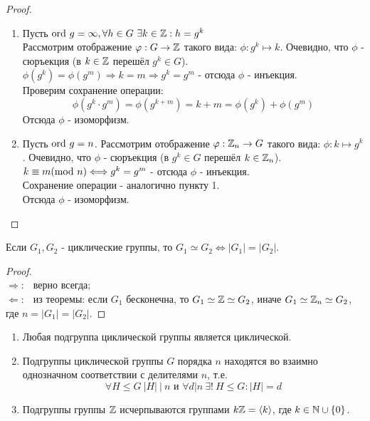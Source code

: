 \begin{proof}\tab
    \begin{enumerate}
        \item Пусть $\textup{ord } g = \infty, \forall h \in G \ \exists k \in \mathbb{Z}: h = g^k$\\
        Рассмотрим отображение $\varphi: G \rightarrow \mathbb{Z}$ такого вида: $\phi: g^k \mapsto k$. Очевидно, что $\phi$ - сюръекция (в $k\in \mathbb{Z}$ перешёл $g^k \in G$).\\
        $\phi(g^k) = \phi(g^m) \Longrightarrow k = m \Longrightarrow g^k = g^m$ - отсюда $\phi$ - инъекция.\\
        Проверим сохранение операции:
        \[\phi(g^k \cdot g^m) = \phi(g^{k+m}) = k+m = \phi(g^k) + \phi(g^m)\]
        Отсюда $\phi$ - изоморфизм.
        \item Пусть $\textup{ord } g = n$. Рассмотрим отображение $\varphi: \mathbb{Z}_n \rightarrow G$ такого вида: $\phi: k \mapsto g^k$. Очевидно, что $\phi$ - сюръекция (в $g^k\in G$ перешёл $k \in \mathbb{Z}_n$).\\
        $k \equiv m (\textup{mod } n) \Longleftrightarrow g^k = g^m$ - отсюда $\phi$ - инъекция.\\
        Сохранение операции - аналогично пункту 1.\\ 
        Отсюда $\phi$ - изоморфизм.
    \end{enumerate}
\end{proof}
\begin{consequense}
    Если $G_1, G_2$ - циклические группы, то $G_1 \simeq G_2 \Longleftrightarrow |G_1| = |G_2|$.
\end{consequense}
\begin{proof} \tab\\
    $\Longrightarrow : \ \ $ верно всегда;\\
    $\Longleftarrow : \ \ $ из теоремы: если $G_1$ бесконечна, то $G_1 \simeq \mathbb{Z} \simeq G_2$, иначе $G_1 \simeq \mathbb{Z}_n \simeq G_2$, где $n = |G_1| = |G_2|$.
\end{proof}
\begin{theoremnum} \tab
    \begin{enumerate}
        \item Любая подгруппа циклической группы является циклической.
        \item Подгруппы циклической группы $G$ порядка $n$ находятся во взаимно однозначном соответствии с делителями $n$, т.е.
        \[\forall H \leq G \ |H| \ |\  n \text{ и } \forall d | n \ \exists! \ H \leq G : |H| = d\]
        \item Подгруппы группы $\mathbb{Z}$ исчерпываются группами $k\mathbb{Z} =  \langle k \rangle$, где $k \in \mathbb{N} \cup \{0\}$.
    \end{enumerate}
\end{theoremnum}

